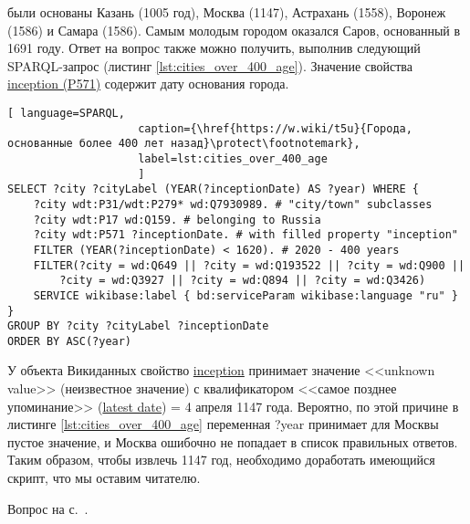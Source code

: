 \begin{task}
    \label{answer:cities_over_400_age}
     были основаны Казань (1005 год), Москва (1147), Астрахань (1558), Воронеж (1586) и Самара (1586). Самым молодым городом оказался Саров, основанный в 1691 году. Ответ на вопрос также можно получить, выполнив следующий SPARQL-запрос (листинг \ref{lst:cities_over_400_age}). Значение свойства \href{https://www.wikidata.org/wiki/Property:P571}{inception (P571)} содержит дату основания города.


    
    \begin{lstlisting}[ language=SPARQL, 
                    caption={\href{https://w.wiki/t5u}{Города, основанные более 400 лет назад}\protect\footnotemark},
                    label=lst:cities_over_400_age
                    ]
SELECT ?city ?cityLabel (YEAR(?inceptionDate) AS ?year) WHERE {
	?city wdt:P31/wdt:P279* wd:Q7930989. # "city/town" subclasses
	?city wdt:P17 wd:Q159. # belonging to Russia
	?city wdt:P571 ?inceptionDate. # with filled property "inception"  
	FILTER (YEAR(?inceptionDate) < 1620). # 2020 - 400 years
	FILTER(?city = wd:Q649 || ?city = wd:Q193522 || ?city = wd:Q900 ||
		?city = wd:Q3927 || ?city = wd:Q894 || ?city = wd:Q3426)
	SERVICE wikibase:label { bd:serviceParam wikibase:language "ru" }
}
GROUP BY ?city ?cityLabel ?inceptionDate
ORDER BY ASC(?year)
\end{lstlisting}

У объекта Викиданных  свойство \href{https://www.wikidata.org/wiki/Property:P571}{inception} принимает значение <<unknown value>> (неизвестное значение) с квалификатором <<самое позднее упоминание>> (\href{https://www.wikidata.org/wiki/Property:P1326}{latest date}) = 4 апреля 1147 года. Вероятно, по этой причине в листинге \ref{lst:cities_over_400_age} переменная ?year принимает для Москвы пустое значение, и Москва ошибочно не попадает в список правильных ответов. Таким образом, чтобы извлечь 1147 год, необходимо доработать имеющийся скрипт, что мы оставим читателю. 



    \small{Вопрос на с.~\pageref{fig:city_relation_Russia_S_N}.}
\end{task}

